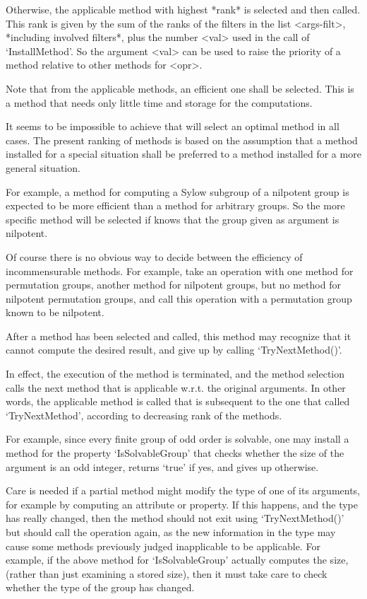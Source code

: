 Otherwise, the applicable method with highest *rank* is selected and then
called.
This rank is given by the sum of the ranks of the filters in the list
<args-filt>,
*including involved filters*,
plus the number <val> used in the call of `InstallMethod'.
So the argument <val> can be used to raise the priority of a method
relative to other methods for <opr>.

Note that from the applicable methods,
an efficient one shall be selected.
This is a method that needs only little time and storage for the
computations.

It seems to be impossible to achieve that {\GAP} will select an optimal
method in all cases.
The present ranking of methods is based on the assumption
that a method installed for a special situation shall be preferred
to a method installed for a more general situation.

For example, a method for computing a Sylow subgroup of a nilpotent
group is expected to be more efficient than a method for arbitrary
groups.
So the more specific method will be selected if {\GAP} knows that the
group given as argument is nilpotent.

Of course there is no obvious way to decide between the efficiency of
incommensurable methods.
For example, take an operation with one method for permutation groups,
another method for nilpotent groups,
but no method for nilpotent permutation groups,
and call this operation with a permutation group known to be
nilpotent.


After a method has been selected and called,
this method may recognize that it cannot compute the desired result,
and give up by calling `TryNextMethod()'.

In effect, the execution of the method is terminated,
and the method selection calls the next method that is applicable w.r.t.
the original arguments.
In other words, the applicable method is called that is subsequent to the
one that called `TryNextMethod',
according to decreasing rank of the methods.

For example, since every finite group of odd order is solvable,
one may install a method for the property `IsSolvableGroup' that checks
whether the size of the argument is an odd integer,
returns `true' if yes,
and gives up otherwise.

Care is  needed  if a  partial  method  might  modify the  type of  one  of its
arguments, for example by computing an attribute  or property. If this happens,
and the type  has   really changed, then  the  method  should not  exit   using
`TryNextMethod()' but  should call the operation again,  as the new information
in the type may   cause  some methods  previously   judged inapplicable to   be
applicable. For  example, if  the  above method  for `IsSolvableGroup' actually
computes the size, (rather than  just examining  a  stored size), then it  must
take care to check whether the type of the group has changed.

